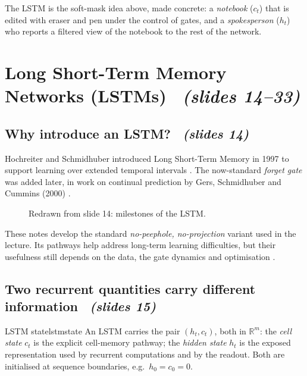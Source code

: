 \documentclass[11pt,a4paper]{article}
\newcommand{\R}{\mathbb{R}}
\newcommand{\sltag}[1]{\texorpdfstring{\ \emph{(slides #1)}}{ (slides #1)}}
\begin{document}
\begin{intuition}
The LSTM is the soft-mask idea above, made concrete: a \emph{notebook} ($c_t$) that is edited with eraser and pen under the control of gates, and a \emph{spokesperson} ($h_t$) who reports a filtered view of the notebook to the rest of the network.
\end{intuition}
\section{Long Short-Term Memory Networks (LSTMs) \sltag{14--33}}

\subsection{Why introduce an LSTM? \sltag{14}}

Hochreiter and Schmidhuber introduced Long Short-Term Memory in 1997 to support learning over extended temporal intervals \cite{r5}. The now-standard \emph{forget gate} was added later, in work on continual prediction by Gers, Schmidhuber and Cummins (2000) \cite{r6}.

\begin{figure}[H]\centering
{}
\caption{Redrawn from slide 14: milestones of the LSTM.}
\end{figure}

These notes develop the standard \emph{no-peephole, no-projection} variant used in the lecture. Its pathways help address long-term learning difficulties, but their usefulness still depends on the data, the gate dynamics and optimisation \cite{r7}.

\subsection{Two recurrent quantities carry different information \sltag{15}}

\begin{definition}{LSTM state}{lstmstate}
An LSTM carries the pair $(h_t,c_t)$, both in $\R^m$: the \emph{cell state} $c_t$ is the explicit cell-memory pathway; the \emph{hidden state} $h_t$ is the exposed representation used by recurrent computations and by the readout. Both are initialised at sequence boundaries, e.g.\ $h_0=c_0=0$.
\end{definition}
\end{document}
